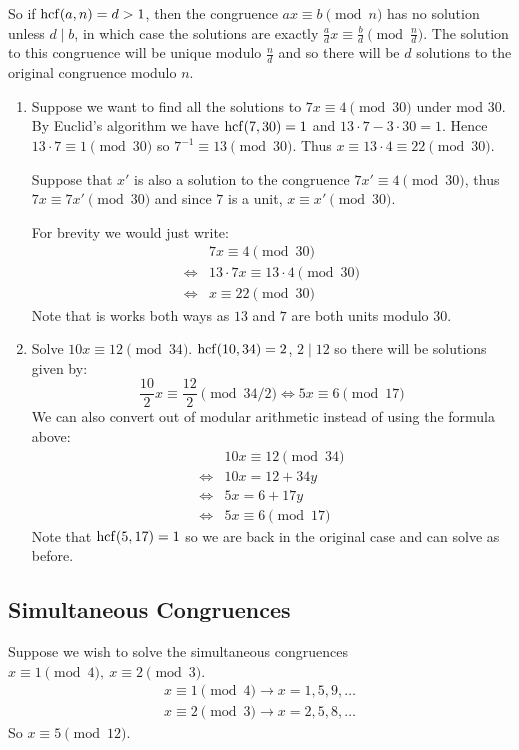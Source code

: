 \documentclass[../main.tex]{subfiles}
\begin{document}
So if $\operatorname{hcf}(a, n) = d > 1$, then the congruence $ax \equiv b \pmod{n}$ has no solution unless $d \mid b$, in which case the solutions are exactly $\frac{a}{d}x \equiv \frac{b}{d} \pmod{\frac{n}{d}}$.
The solution to this congruence will be unique modulo $\frac{n}{d}$ and so there will be $d$ solutions to the original congruence modulo $n$.
\begin{example}
  \begin{enumerate}
    \item Suppose we want to find all the solutions to $7x \equiv 4 \pmod{30}$ under mod $30$.
      By Euclid's algorithm we have $\operatorname{hcf}(7, 30) = 1$ and $13 \cdot 7 - 3 \cdot 30 = 1$.
      Hence $13 \cdot 7 \equiv 1 \pmod{30}$ so $7^{-1} \equiv 13 \pmod{30}$.
      Thus $x \equiv 13 \cdot 4 \equiv 22 \pmod{30}$.

      Suppose that $x'$ is also a solution to the congruence $7x' \equiv 4 \pmod{30}$, thus $7x \equiv 7x' \pmod{30}$ and since $7$ is a unit, $x \equiv x' \pmod{30}$.

      For brevity we would just write:
      \begin{align*}
        &7x \equiv 4 \pmod{30} \\
        \iff& 13 \cdot 7x \equiv 13 \cdot 4 \pmod{30} \\
        \iff& x \equiv 22 \pmod{30}
      \end{align*}
      Note that is works both ways as $13$ and $7$ are both units modulo 30.
    \item Solve $10x \equiv 12 \pmod{34}$.
      $\operatorname{hcf}(10, 34) = 2$, $2 \mid 12$ so there will be solutions given by:
      \[
        \frac{10}{2}x \equiv \frac{12}{2} \pmod{34/2} \iff 5x \equiv 6 \pmod{17}
      \]
      We can also convert out of modular arithmetic instead of using the formula above:
      \begin{align*}
        &10x \equiv 12 \pmod{34} \\
        \iff& 10x = 12 + 34y \\
        \iff& 5x = 6 + 17y \\
        \iff& 5x \equiv 6 \pmod{17}
      \end{align*}
      Note that $\operatorname{hcf}(5, 17) = 1$ so we are back in the original case and can solve as before.
  \end{enumerate}
\end{example}
\subsection{Simultaneous Congruences}
Suppose we wish to solve the simultaneous congruences $x \equiv 1 \pmod{4},\ x \equiv 2 \pmod{3}$.
\begin{align*}
  x \equiv 1 \pmod{4} \to x = 1, 5, 9, \ldots \\
  x \equiv 2 \pmod{3} \to x = 2, 5, 8, \ldots
\end{align*}
So $x \equiv 5 \pmod{12}$.
\end{document}
